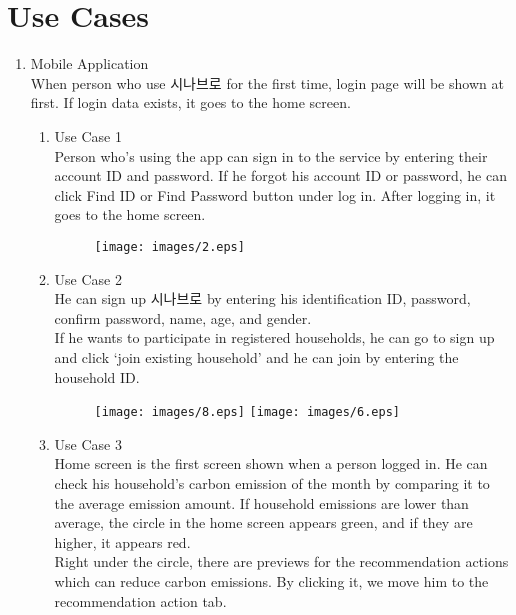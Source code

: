 \documentclass[11pt, conference]{IEEEtran}
\begin{document}
\section{\Large{Use Cases}}
\begin{enumerate}[label=\arabic*]
    \item {\large{Mobile Application}}\\
    When person who use 시나브로 for the first time, login page will be shown at first. If login data exists, it goes to the home screen. 
    \begin{enumerate}[label=\alph*]
        \begin{figure}[H]
            \centering
            \texttt{[image: images/1.eps]}
        \end{figure}
        \item Use Case 1\\
        Person who’s using the app can sign in to the service by entering their account ID and password. If he forgot his account ID or password, he can click Find ID or Find Password button under log in.  After logging in, it goes to the home screen.
        \begin{figure}[H]
            \centering
            \texttt{[image: images/2.eps]}
        \end{figure}
        \item Use Case 2\\
        He can sign up 시나브로 by entering his identification ID, password, confirm password, name, age, and gender. \\
        If he wants to participate in registered households, he can go to sign up and click ‘join existing household’ and he can join by entering the household ID. 
        \begin{figure}[H]
            \centering
            \texttt{[image: images/8.eps]}
            \texttt{[image: images/6.eps]}
        \end{figure}
        \item Use Case 3\\
        Home screen is the first screen shown when a person logged in. He can check his household’s carbon emission of the month by comparing it to the average emission amount. If household emissions are lower than average, the circle in the home screen appears green, and if they are higher, it appears red. \\
        Right under the circle, there are previews for the recommendation actions which can reduce carbon emissions. By clicking it, we move him to the recommendation action tab.\\

\end{enumerate}
\end{enumerate}
\end{document}
